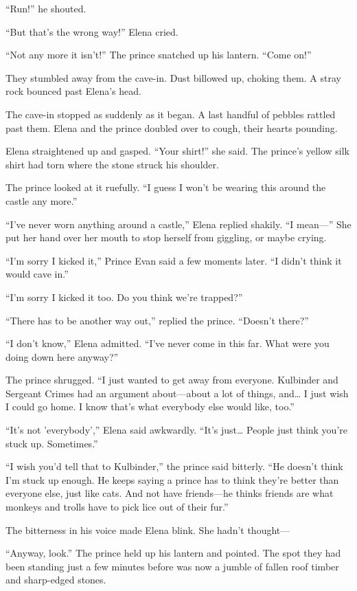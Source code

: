 \documentclass[10pt]{book}
\begin{document}
``Run!'' he shouted.

``But that's the wrong way!'' Elena cried.

``Not any more it isn't!'' The prince snatched up his lantern. ``Come on!''

They stumbled away from the cave-in. Dust billowed up, choking them. A stray rock bounced past Elena's head.

The cave-in stopped as suddenly as it began. A last handful of pebbles rattled past them. Elena and the prince doubled over to cough, their hearts pounding.

Elena straightened up and gasped.  ``Your shirt!'' she said.  The prince's yellow silk shirt had torn where the stone struck his shoulder.

The prince looked at it ruefully.  ``I guess I won't be wearing this around the castle any more.''

``I've never worn anything around a castle,'' Elena replied shakily.  ``I mean---''  She put her hand over her mouth to stop herself from giggling, or maybe crying.

``I'm sorry I kicked it,'' Prince Evan said a few moments later. ``I didn't think it would cave in.''

``I'm sorry I kicked it too. Do you think we're trapped?''

``There has to be another way out,'' replied the prince. ``Doesn't there?''

``I don't know,'' Elena admitted. ``I've never come in this far. What were you doing down here anyway?''

The prince shrugged. ``I just wanted to get away from everyone. Kulbinder and Sergeant Crimes had an argument about---about a lot of things, and{\ldots} I just wish I could go home. I know that's what everybody else would like, too.''

``It's not 'everybody','' Elena said awkwardly. ``It's just{\ldots} People just think you're stuck up.  Sometimes.''

``I wish you'd tell that to Kulbinder,'' the prince said bitterly. ``He doesn't think I'm stuck up enough.  He keeps saying a prince has to think they're better than everyone else, just like cats.  And not have friends---he thinks friends are what monkeys and trolls have to pick lice out of their fur.''

The bitterness in his voice made Elena blink.  She hadn't thought---

``Anyway, look.'' The prince held up his lantern and pointed.  The spot they had been standing just a few minutes before was now a jumble of fallen roof timber and sharp-edged stones.
\end{document}
